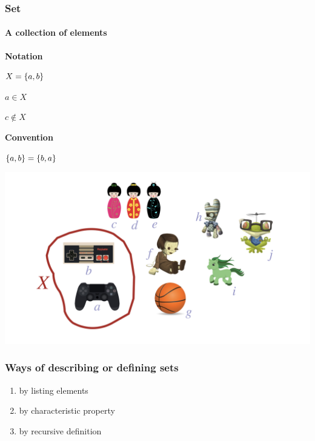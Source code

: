 \documentclass[fleqn,10pt,serif,xcolor=svgnames,xcolor=table,aspectratio=169,handout]{beamer}
\begin{document}
\begin{frame}
  \frametitle{Set}
  \framesubtitle{A collection of elements}
  \begin{minipage}{0.22\textwidth}
    \textbf{Notation}

    $X = \left\{a,b\right\}$

    $a \in X$

    $c \not \in X$

    \bigskip

    \textbf{Convention}

    $\left\{a,b\right\} = \left\{b,a\right\}$
  \end{minipage}
  \begin{minipage}{0.75\textwidth}\centering
    \includegraphics[width=\textwidth]{01a-sets-elements-cardinality/01a-sets-elements-cardinality-004.jpeg}
  \end{minipage}

\end{frame}

\begin{frame}

  \frametitle{Ways of describing or defining sets}

  \begin{minipage}{0.4\linewidth}
    \begin{enumerate}
      \item by listing elements
      \item by characteristic property
      \item by recursive definition
    \end{enumerate}
  \end{minipage}
  \begin{minipage}{0.55\linewidth}
  \end{minipage}

\end{frame}
\end{document}
